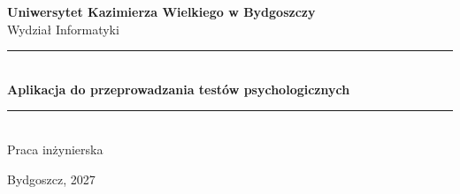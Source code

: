 \documentclass[12pt, a4paper, oneside]{report}
\begin{document}
\begin{titlepage}
  \centering

  \vspace*{1cm}

  {\large\textbf{Uniwersytet Kazimierza Wielkiego w Bydgoszczy}}\\[0.3cm]
  {\large Wydział Informatyki}\\[2cm]

  \rule{\textwidth}{0.4pt}\\[0.6cm]

  {\LARGE\bfseries
    Aplikacja do przeprowadzania testów psychologicznych
  }\\[0.4cm]

  \rule{\textwidth}{0.4pt}\\[2cm]

  {\large Praca inżynierska}\\[2cm]

  \vfill

  {\large Bydgoszcz, 2027}

\end{titlepage}


%
%





\end{document}
